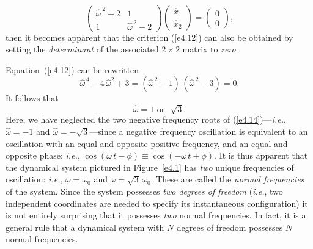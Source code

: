 \begin{equation}
\left(
\begin{array}{cc}
\hat{\omega}^{\,2}-2 & 1\\[0.5ex]
1&\hat{\omega}^{\,2}-2
\end{array}\right)\left(
\begin{array}{c}
\hat{x}_1\\[0.5ex] \hat{x}_2
\end{array}\right) = \left(
\begin{array}{c}
0\\[0.5ex] 0
\end{array}\right) ,
\end{equation}
then it becomes apparent  that the criterion (\ref{e4.12}) can also be obtained by
setting the {\em determinant}\/ of the associated $2\times 2$ matrix to {\em zero}.

Equation~(\ref{e4.12}) can be rewritten
\begin{equation}\label{e4.14}
\hat{\omega}^{\,4} - 4\,\hat{\omega}^2+3 = (\hat{\omega}^{\,2}-1)\,(\hat{\omega}^{\,2}-3)=0.
\end{equation}
It follows that
\begin{equation}
\hat{\omega} = 1 \mbox{~or~~} \sqrt{3}.
\end{equation}
 Here, we have neglected
the two  negative frequency roots of (\ref{e4.14})---{\em i.e.}, $\hat{\omega}=-1$ and $\hat{\omega}=-\sqrt{3}$---since a negative frequency oscillation
is equivalent to an oscillation with an equal and opposite positive frequency, and
an equal and opposite phase: {\em i.e.},
$\cos(\omega\,t-\phi)\equiv \cos(-\omega\,t+\phi)$. 
 It is thus apparent that
the dynamical system  pictured in Figure~\ref{e4.1} has {\em two}\/  unique  frequencies of oscillation: {\em i.e.},  $\omega=\omega_0$
and $\omega=\sqrt{3}\,\omega_0$. These are called the {\em normal frequencies}\/ of the
system.
Since the system possesses {\em two degrees of
freedom}\/ ({\em i.e.}, two independent coordinates are needed to specify its
instantaneous configuration) it is not entirely surprising that it possesses {\em two}\/
 normal frequencies. In fact, it is a general rule that a dynamical system
with $N$ degrees of freedom possesses $N$  normal frequencies. 

